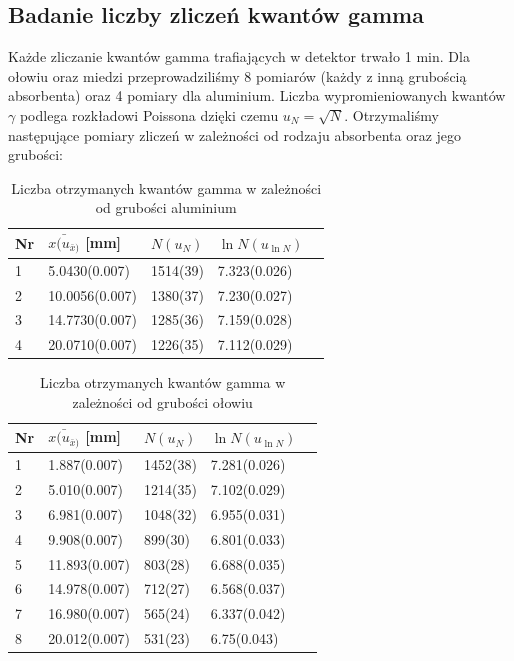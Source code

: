 \documentclass[a4paper]{article}
\begin{document}
\subsection{Badanie liczby zliczeń kwantów gamma}
Każde zliczanie kwantów gamma trafiających w detektor trwało 1 min. Dla ołowiu oraz miedzi przeprowadziliśmy 8 pomiarów (każdy z inną grubością absorbenta) oraz 4 pomiary dla aluminium.
Liczba wypromieniowanych kwantów $\gamma$ podlega rozkładowi Poissona dzięki czemu $u_N=\sqrt{N}$.
Otrzymaliśmy następujące pomiary zliczeń w zależności od rodzaju absorbenta oraz jego grubości:\\
\begin{table}[h!]
\centering
\begin{tabular}{ | l | l | l | l | l | }
\hline
Nr & $\bar{x(u_{\bar{x})}}$ [mm] & $N(u_N)$ & $\ln{N}(u_{\ln{N}})$ \\ \hline
1 & 5.0430(0.007) & 1514(39) & 7.323(0.026)  \\ \hline
2 & 10.0056(0.007) & 1380(37) & 7.230(0.027)  \\ \hline
3 & 14.7730(0.007) & 1285(36) & 7.159(0.028) \\ \hline
4 & 20.0710(0.007) & 1226(35) & 7.112(0.029) \\ \hline
\end{tabular}
\caption{Liczba otrzymanych kwantów gamma w zależności od grubości aluminium}
\label{pomiary_sruba}
\end{table}



\begin{table}[h!]
\centering
\begin{tabular}{ | l | l | l | l | l | }
\hline
Nr & $\bar{x(u_{\bar{x})}}$ [mm] & $N(u_N)$ & $\ln{N}(u_{\ln{N}})$ \\ \hline
1 & 1.887(0.007) & 1452(38) & 7.281(0.026)  \\ \hline
2 & 5.010(0.007) & 1214(35) & 7.102(0.029)  \\ \hline
3 & 6.981(0.007) & 1048(32) & 6.955(0.031) \\ \hline
4 & 9.908(0.007) & 899(30) & 6.801(0.033) \\ \hline
5 & 11.893(0.007) & 803(28) & 6.688(0.035) \\ \hline
6 & 14.978(0.007) & 712(27) & 6.568(0.037) \\ \hline
7 & 16.980(0.007) & 565(24) & 6.337(0.042) \\ \hline
8 & 20.012(0.007) & 531(23) & 6.75(0.043) \\ \hline   
\end{tabular}
\caption{Liczba otrzymanych kwantów gamma w zależności od grubości ołowiu}
\label{pomiary_sruba}
\end{table}
\end{document}
